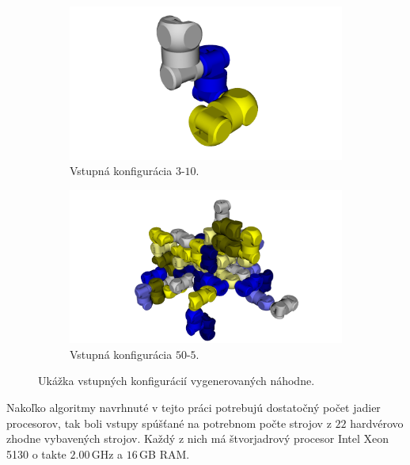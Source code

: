 \documentclass[
  printed, %
  oneside, %
  notable,   %
  nolof,     %
  nolot,     %
]{fithesis3}
\begin{document}
\begin{figure}[hbt!]
    \centering
    \begin{subfigure}[b]{0.47\textwidth}
        \includegraphics[width=\textwidth]{pictures/3-10-init.png}
        \caption[3-10-init]{Vstupná konfigurácia $3$-$10$.}
        \label{fig:3-10-init}
    \end{subfigure}
    \begin{subfigure}[b]{0.47\textwidth}
        \includegraphics[width=\textwidth]{pictures/50-5-init.png}
        \caption[50-5-init]{Vstupná konfigurácia $50$-$5$.}
    \end{subfigure}
    \caption[Ukážkové vstupné konfigurácie]{Ukážka vstupných konfigurácií vygenerovaných náhodne. }
    \label{fig:rofibotExamples}
\end{figure}

\newcommand{\comment}[1]{}
\comment{
Okrem náhodne generovaných vstupov boli skúšané aj ručne vytvorené vstupy, kde nie je nutne zaručená existencia rekonfigurácie. Niektoré príklady vizualizuje obrázok \ref{fig:rotationExampleByHand}. }

Nakoľko algoritmy navrhnuté v tejto práci potrebujú dostatočný počet jadier procesorov, tak boli vstupy spúšťané na potrebnom počte strojov z $22$ hardvérovo zhodne vybavených strojov. Každý z nich má štvorjadrový procesor Intel Xeon 5130 o takte $2.00$\,GHz a $16$\,GB RAM. 
\end{document}
